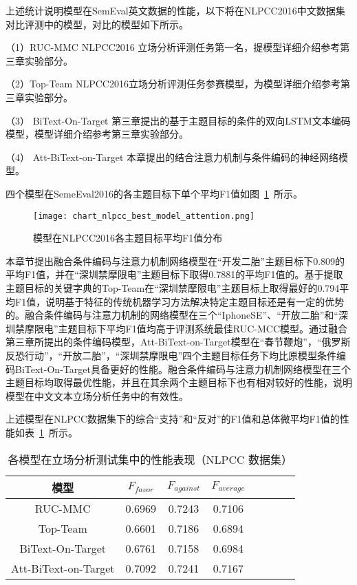 上述统计说明模型在SemEval英文数据的性能，以下将在NLPCC2016中文数据集对比评测中的模型，对比的模型如下所示。

（1）RUC-MMC NLPCC2016 立场分析评测任务第一名，提模型详细介绍参考第三章实验部分。

（2）Top-Team NLPCC2016立场分析评测任务参赛模型，为模型详细介绍参考第三章实验部分。

（3） BiText-On-Target 第三章提出的基于主题目标的条件的双向LSTM文本编码模型，模型详细介绍参考第三章实验部分。

（4） Att-BiText-on-Target 本章提出的结合注意力机制与条件编码的神经网络模型。

四个模型在SemeEval2016的各主题目标下单个平均F1值如图~\ref{chart_nlpcc_best_model_attention}~所示。
\begin{figure}[htbp]
	\centering
	\texttt{[image: chart\_nlpcc\_best\_model\_attention.png]}
	\caption[rnn_vanish]{模型在NLPCC2016各主题目标平均F1值分布}
	\label{chart_nlpcc_best_model_attention}
\end{figure}


本章节提出融合条件编码与注意力机制网络模型在“开发二胎”主题目标下0.809的平均F1值，并在“深圳禁摩限电”主题目标下取得0.7881的平均F1值的。基于提取主题目标的关键字典的Top-Team在“深圳禁摩限电”主题目标上取得最好的0.794平均F1值，说明基于特征的传统机器学习方法解决特定主题目标还是有一定的优势的。融合条件编码与注意力机制的网络模型在三个“IphoneSE”、“开放二胎”和“深圳禁摩限电”主题目标下平均F1值均高于评测系统最佳RUC-MCC模型。通过融合第三章所提出的条件编码模型，Att-BiText-on-Target模型在“春节鞭炮”，“俄罗斯反恐行动”，“开放二胎”，“深圳禁摩限电”四个主题目标任务下均比原模型条件编码BiText-On-Target具备更好的性能。融合条件编码与注意力机制网络模型在三个主题目标均取得最优性能，并且在其余两个主题目标下也有相对较好的性能，说明模型在中文文本立场分析任务中的有效性。

上述模型在NLPCC数据集下的综合“支持”和“反对”的F1值和总体微平均F1值的性能如表~\ref{nlpcc_res_attention}~所示。
\begin{table}[htbp]
	\caption[table123]{各模型在立场分析测试集中的性能表现（NLPCC 数据集）}
	\label{nlpcc_res_attention}
	\vspace{0.5em}\centering\wuhao
	\begin{tabular}{cccccccc}
		\toprule[1.5pt]
		模型& $F_{favor}$&$F_{against}$&$F_{average}$ \\
		\midrule[1pt]
		RUC-MMC\citeup{xu2016overview}&0.6969&0.7243&0.7106\\
		Top-Team\citeup{xu2016overview}&0.6601&0.7186&0.6894\\
		BiText-On-Target&0.6761&0.7158&0.6984\\
	Att-BiText-on-Target&0.7092&0.7241&0.7167\\
		\bottomrule[1.5pt]
	\end{tabular}
\end{table}

